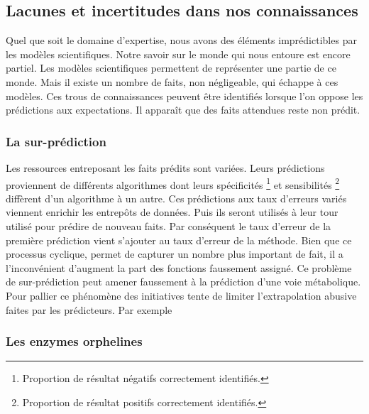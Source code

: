 \begin{refsegment}
    \subsection{Lacunes et incertitudes dans nos connaissances}\label{subsec:lacunes}
    
    Quel que soit le domaine d’expertise, nous avons des éléments imprédictibles par les modèles scientifiques. Notre savoir sur le monde qui nous entoure est encore partiel. Les modèles scientifiques permettent de représenter une partie de ce monde. Mais il existe un nombre de faits, non négligeable, qui échappe à ces  modèles. Ces trous de connaissances peuvent être identifiés lorsque l’on oppose les prédictions aux expectations. Il apparaît que des faits attendues reste non prédit.
    
    
    
    \subsubsection{La sur-prédiction}
    
    Les ressources entreposant les faits prédits sont variées. Leurs prédictions proviennent  de différents algorithmes dont leurs spécificités \footnote{Proportion de résultat négatifs correctement identifiés.} et sensibilités \footnote{Proportion de résultat positifs correctement identifiés.} diffèrent d’un algorithme à un autre. Ces prédictions aux taux d’erreurs variés viennent enrichir les entrepôts de données. Puis ils seront utilisés à leur tour utilisé pour prédire de nouveau faits. Par conséquent  le taux d’erreur de la première prédiction vient s’ajouter au taux d’erreur de la méthode. Bien que ce processus cyclique, permet de capturer un nombre plus important de fait, il a l’inconvénient d'augment la part des fonctions faussement assigné. Ce problème de sur-prédiction peut amener faussement à la prédiction d'une voie métabolique. Pour pallier ce phénomène des initiatives tente de limiter l’extrapolation abusive faites par les prédicteurs. Par exemple \citeauthor{pfeiffer2015manual}
    
    
    \subsubsection{Les enzymes orphelines}
    

\end{refsegment}
